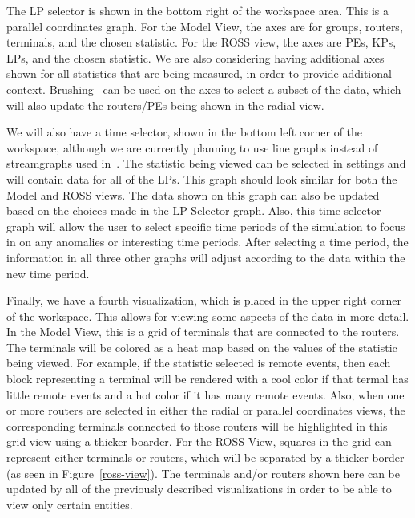 \documentclass{acm_proc_article-sp}
\begin{document}
The LP selector is shown in the bottom right of the workspace area.  This is a parallel coordinates graph.  For the Model View, the axes are for groups, routers, terminals, and the chosen statistic.  For the ROSS view, the axes are PEs, KPs, LPs, and the chosen statistic.  We are also considering having additional axes shown for all statistics that are being measured, in order to provide additional context.  Brushing~\cite{hauser} can be used on the axes to select a subset of the data, which will also update the routers/PEs being shown in the radial view.  

We will also have a time selector, shown in the bottom left corner of the workspace, although we are currently planning to use line graphs instead of streamgraphs used in~\cite{cheng}.  The statistic being viewed can be selected in settings and will contain data for all of the LPs.  This graph should look similar for both the Model and ROSS views.  The data shown on this graph can also be updated based on the choices made in the LP Selector graph. Also, this time selector graph will allow the user to select specific time periods of the simulation to focus in on any anomalies or interesting time periods. After selecting a time period, the information in all three other graphs will adjust according to the data within the new time period. 

Finally, we have a fourth visualization, which is placed in the upper right corner of the workspace.  This allows for viewing some aspects of the data in more detail.  In the Model View, this is a grid of terminals that are connected to the routers.  The terminals will be colored as a heat map based on the values of the statistic being viewed. For example, if the statistic selected is remote events, then each block representing a terminal will be rendered with a cool color if that termal has little remote events and a hot color if it has many remote events. Also, when one or more routers are selected in either the radial or parallel coordinates views, the corresponding terminals connected to those routers will be highlighted in this grid view using a thicker boarder. For the ROSS View, squares in the grid can represent either terminals or routers, which will be separated by a thicker border (as seen in Figure~\ref{ross-view}).  The terminals and/or routers shown here can be updated by all of the previously described visualizations in order to be able to view only certain entities.  
\end{document}
